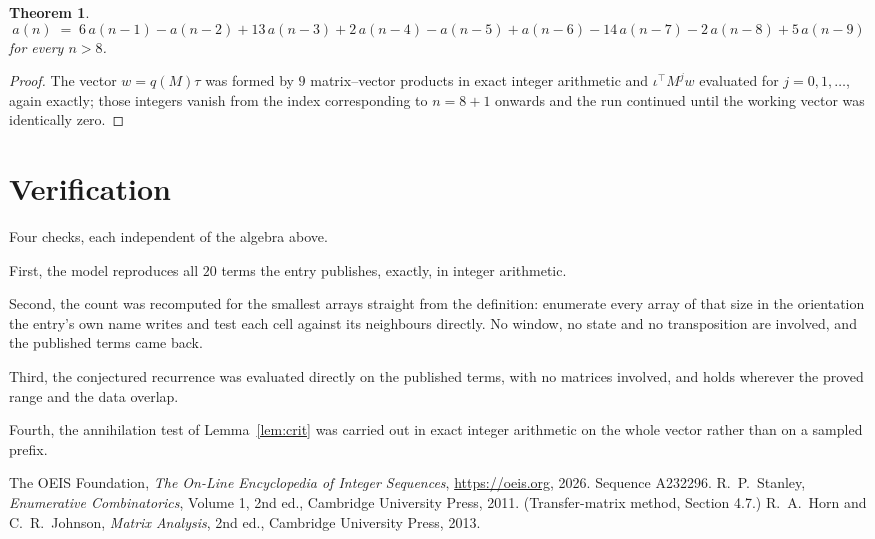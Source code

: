 \documentclass[11pt,a4paper]{article}
\theoremstyle{plain}
\newtheorem{theorem}{Theorem}
\theoremstyle{definition}
\begin{document}
\begin{theorem}
\[
a(n)\;=\;6\,a(n-1) - a(n-2) + 13\,a(n-3) + 2\,a(n-4) - a(n-5) + a(n-6) - 14\,a(n-7) - 2\,a(n-8) + 5\,a(n-9)
\]
for every $n>8$.
\end{theorem}

\begin{proof}
The vector $w=q(M)\tau$ was formed by $9$ matrix--vector products in exact integer
arithmetic and $\iota^{\!\top}M^{j}w$ evaluated for $j=0,1,\dots$, again exactly; those
integers vanish from the index corresponding to $n=8+1$ onwards and the run continued
until the working vector was identically zero.
\end{proof}

\section{Verification}

Four checks, each independent of the algebra above.

First, the model reproduces all $20$ terms the entry publishes, exactly, in integer
arithmetic.

Second, the count was recomputed for the smallest arrays straight from the definition:
enumerate every array of that size in the orientation the entry's own name writes and test each
cell against its neighbours directly. No window, no state and no transposition are involved,
and the published terms came back.

Third, the conjectured recurrence was evaluated directly on the published terms, with no
matrices involved, and holds wherever the proved range and the data overlap.

Fourth, the annihilation test of Lemma~\ref{lem:crit} was carried out in exact integer
arithmetic on the whole vector rather than on a sampled prefix.

\begin{thebibliography}{9}
 The OEIS Foundation, \emph{The On-Line Encyclopedia of Integer
Sequences}, \url{https://oeis.org}, 2026. Sequence A232296.
 R.~P.~Stanley, \emph{Enumerative Combinatorics}, Volume 1, 2nd ed.,
Cambridge University Press, 2011. (Transfer-matrix method, Section 4.7.)
 R.~A.~Horn and C.~R.~Johnson, \emph{Matrix Analysis}, 2nd ed., Cambridge
University Press, 2013.
\end{thebibliography}
\end{document}
